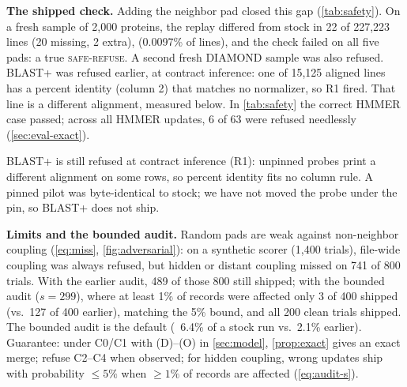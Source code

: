 \documentclass[letterpaper,twocolumn,10pt]{article}
\theoremstyle{definition}
\newcommand{\dec}[1]{\textsc{#1}}
\begin{document}
\textbf{The shipped check.} Adding the neighbor pad closed this gap (\cref{tab:safety}). On a fresh sample of 2{,}000
proteins, the replay differed from stock in 22 of 227{,}223 lines (20 missing, 2 extra), (0.0097\% of lines), and the check failed on all five pads: a true \dec{safe-refuse}. A second fresh DIAMOND sample was also refused. BLAST+ was refused earlier, at contract
inference: one of 15{,}125 aligned lines has a percent identity (column 2) that matches no normalizer, so R1 fired. That line is a different alignment, measured below. In \cref{tab:safety} the correct HMMER case passed; across all
HMMER updates, 6 of 63 were refused needlessly (\cref{sec:eval-exact}).

BLAST+ is still refused at contract inference (R1): unpinned probes print a different alignment on some rows, so percent
identity fits no column rule. A pinned pilot was byte\nobreakdash-identical to stock; we have not moved the probe under the pin, so
BLAST+ does not ship.

\textbf{Limits and the bounded audit.} Random pads are weak against non\nobreakdash-neighbor coupling (\cref{eq:miss}, \cref{fig:adversarial}):
on a synthetic scorer (1{,}400 trials), file\nobreakdash-wide coupling was always refused, but hidden or distant coupling missed on 741 of
800 trials. With the earlier audit, 489 of those 800 still shipped; with the bounded audit ($s{=}299$), where at least 1\% of
records were affected only 3 of 400 shipped (vs.\ 127 of 400 earlier), matching the 5\% bound, and all 200 clean trials
shipped. The bounded audit is the default (~6.4\% of a stock run vs.\ 2.1\% earlier). Guarantee: under C0/C1 with
(D)--(O) in \cref{sec:model}, \cref{prop:exact} gives an exact merge; refuse C2--C4 when observed; for hidden
coupling, wrong updates ship with probability $\le 5\%$ when $\ge 1\%$ of records are affected (\cref{eq:audit-s}).
\end{document}
